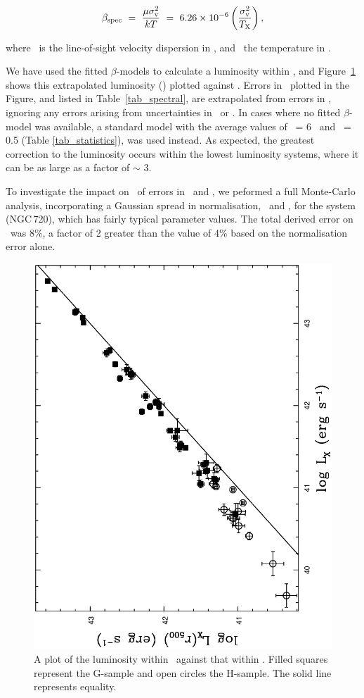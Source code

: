 \documentclass[usenatbib]{mn2e}
\begin{document}
\begin{equation}
\beta_{\mathrm{spec}} ~ = ~ \frac{\mu\sigma_{\mathrm{v}}^{2}}{kT} ~ = ~ 6.26 \times 10^{-6} \left(\frac{\sigma_{\mathrm{v}}^{2}}{T_{\mathrm{X}}}\right),
\label{eqn_betaspec}
\end{equation}

\noindent where \sigmav\ is the line-of-sight velocity dispersion in \kmps, and
\TX\ the temperature in \kev.

We have used the fitted $\beta$-models to calculate a luminosity within \rfh, and
Figure~\ref{fig_LXrfh_LX} shows this extrapolated luminosity (\LXrfh) plotted
against \LX.  Errors in \LXrfh\ plotted in the Figure, and listed in 
Table~\ref{tab_spectral}, are extrapolated from errors in \LX, ignoring any
errors arising from uncertainties in \rcore\ or \betafit.  In cases where no
fitted $\beta$-model was available, a standard model with the average values of
\rcore\ = 6 \kpc\ and \betafit\ = 0.5 (Table \ref{tab_statistics}), was used
instead.  As expected, the greatest correction to the luminosity occurs within
the lowest luminosity systems, where it can be as large as a factor of $\sim$ 3.

To investigate the impact on  \LXrfh\ of errors in \rcore\ and \betafit, we
peformed a full Monte-Carlo analysis, incorporating a Gaussian spread in
normalisation, \rcore\ and \betafit, for the system (NGC\,720), which has fairly
typical parameter values. The total derived error on \LXrfh\ was 8\%, a factor of
2 greater than the value of 4\% based on the normalisation error alone.

\begin{figure}
  \includegraphics[height=\linewidth,angle=270]{fig_05.ps}
  \caption{A plot of the luminosity within \rfh\ against that within \rcut.
           Filled squares represent the G-sample and open circles the H-sample.
           The solid line represents equality.}
  \label{fig_LXrfh_LX}
\end{figure}
\end{document}
